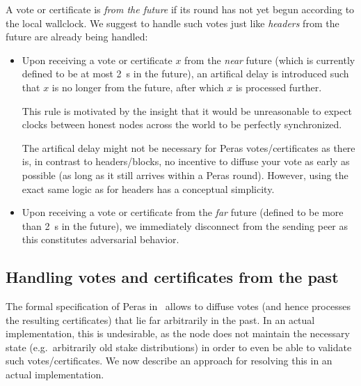 A vote or certificate is \emph{from the future} if its round has not yet begun according to the local wallclock.
We suggest to handle such votes just like \emph{headers} from the future are already being handled:
\begin{itemize}
\item
  Upon receiving a vote or certificate $x$ from the \emph{near} future (which is currently defined to be at most \qty{2}{\s} in the future), an artifical delay is introduced such that $x$ is no longer from the future, after which $x$ is processed further.

  This rule is motivated by the insight that it would be unreasonable to expect clocks between honest nodes across the world to be perfectly synchronized.

  The artifical delay might not be necessary for Peras votes/certificates as there is, in contrast to headers/blocks, no incentive to diffuse your vote as early as possible (as long as it still arrives within a Peras round).
  However, using the exact same logic as for headers has a conceptual simplicity.
\item
  Upon receiving a vote or certificate from the \emph{far} future (defined to be more than \qty{2}{\s} in the future), we immediately disconnect from the sending peer as this constitutes adversarial behavior.
\end{itemize}

\subsection{Handling votes and certificates from the past}\label{sec:votes certs from the past}

The formal specification of Peras in~\cite{peras-cip} allows to diffuse votes (and hence processes the resulting certificates) that lie far arbitrarily in the past.
In an actual implementation, this is undesirable, as the node does not maintain the necessary state (e.g.\ arbitrarily old stake distributions) in order to even be able to validate such votes/certificates.
We now describe an approach for resolving this in an actual implementation.

